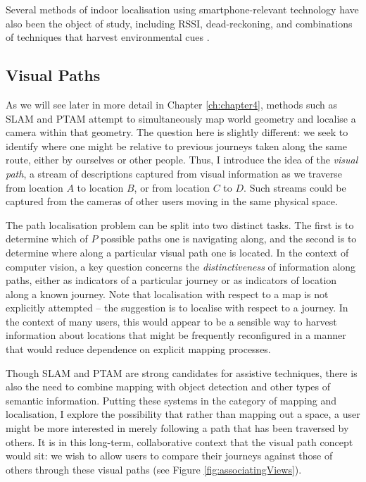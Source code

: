 Several methods of indoor localisation using smartphone\--re\-le\-vant technology have also been the object of study, including RSSI, dead-reckoning, and combinations of techniques that harvest environmental cues \cite{Wang2012,Shen}. 
 

\subsection{Visual Paths} 

 As we will see later in more detail in Chapter \ref{ch:chapter4}, methods such as SLAM and PTAM attempt to simultaneously map world geometry and localise a camera within that geometry.  The question here is slightly different: we seek to identify where one might be relative to previous journeys taken along the same route, either by ourselves or other people.  Thus, I introduce the idea of the \textit{visual path}, a stream of descriptions captured from visual information as we traverse from location $A$ to location $B$, or from location $C$ to $D$. Such streams could be captured from the cameras of other users moving in the same physical space.

The path localisation problem can be split into two distinct tasks.  The first is to determine which of $P$ possible paths one is navigating along, and the second is to determine where along a particular visual path one is located.  In the context of computer vision, a key question concerns the \textit{distinctiveness} of information along paths, either as indicators of a particular journey or as indicators of location along a known journey.  Note that localisation with respect to a map is not explicitly attempted -- the suggestion is to localise with respect to a journey.  In the context of many users, this would appear to be a sensible way to harvest information about locations that might be frequently reconfigured in a manner that would reduce dependence on explicit mapping processes.

Though SLAM and PTAM are strong candidates for assistive techniques, there is also the need to combine mapping with object detection and other types of semantic information.  Putting these systems in the category of mapping and localisation, I explore the possibility that rather than mapping out a space, a user might be more interested in merely following a path that has been traversed by others.  It is in this long-term, collaborative context that the visual path concept would sit: we wish to allow users to compare their journeys against those of others through these visual paths (see Figure \ref{fig:associatingViews}).

